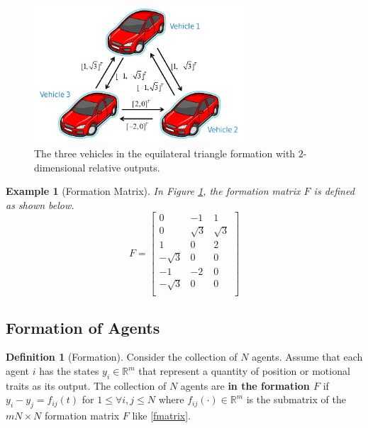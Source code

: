 \documentclass[11pt, a4paper, oneside, openany, reqno]{book}
\newtheorem{example}{Example}
\theoremstyle{definition}
\newtheorem{definition}[theorem]{Definition}
\theoremstyle{remark}
\numberwithin{equation}{chapter} %
\newcommand{\R}{\ensuremath{{\mathbb R}}}
\begin{document}
\begin{figure}[htp]
	\centering
	\includegraphics[width=0.70\textwidth]{triangle.png}
	\caption{The three vehicles in the equilateral triangle formation 
			with $ 2 $-dimensional relative outputs.}
	\label{trivehicles}
\end{figure}

\begin{example}[Formation Matrix]
	In Figure \ref{trivehicles}, the formation matrix $ F $ is defined as shown below.
	\begin{equation}\label{exfmatrix}
		F = \left[ \begin{array}{ccc } 
		0 & -1 & 1 \\
		0 & \sqrt{3} & \sqrt{3} \\
		1 & 0 & 2 \\
		-\sqrt{3} & 0 & 0 \\
		-1 & -2 & 0 \\
		-\sqrt{3} & 0 & 0 \\
		\end{array} \right]
	\end{equation}
\end{example}

\subsection{Formation of Agents}

\begin{definition}[Formation]
	Consider the collection of $ N $ agents. 
	Assume that each agent $ i $ has the states $ y_i \in \R^m $ 
	that represent a quantity of position or motional traits as its output.
	The collection of $ N $ agents are \textbf{in the formation $ F $}
	if $ y_i - y_j = f_{ij}(t) $ for $ 1 \leq \forall i,j \leq N $
	where $ f_{ij}(\cdot) \in \R^m $ is the submatrix   
	of the $ mN \times N $ formation matrix $ F $ like \eqref{fmatrix}.
\end{definition}
\end{document}
